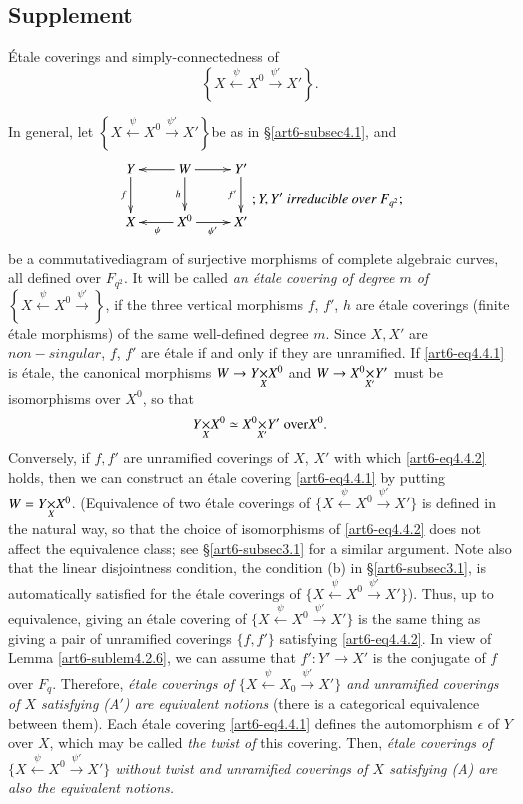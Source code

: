 \subsection{Supplement}\label{sec6-subsec4.4}
\'Etale coverings and simply-connectedness of 
$$
\left\{X \xleftarrow{\psi} X^0 \xrightarrow{\psi'} X' \right\}.
$$

In general, let $\left\{X \xleftarrow{\psi} X^0 \xrightarrow{\psi'} X' \right\}$be as in \S \ref{art6-subsec4.1}, and
\setcounter{equation}{0}
\begin{equation}
\vcenter{
\xymatrix{
Y \ar[d]_-f & W\ar[d]_-h\ar[r]\ar[l] & Y'\ar[d]_-{f'}\\
X & X^0 \ar[r]_{\psi'} \ar[l]^{\psi} & X'
} }
; Y, Y' \textit{ irreducible over } F_{q^2};
\label{art6-eq4.4.1}
\end{equation}
be a commutative\pageoriginale diagram of surjective morphisms of complete algebraic curves, all defined over $F_{q^2}$. It will be called \textit{an \'etale covering of degree $m$ of}  $\left\{X \xleftarrow{\psi} X^0 \xrightarrow{\psi'} \right\}$, if the three vertical morphisms $f$, $f'$, $h$ are \'etale coverings (finite \'etale morphisms) of the same well-defined degree $m$. Since $X, X'$ are $non-singular$, $f$, $f'$ are \'etale if and only if they are unramified. If \eqref{art6-eq4.4.1} is \'etale, the canonical morphisms $W \to \fprod{Y}{X^0}{X}$ and $W \to \fprod{X^0}{Y'}{X'}$ must be isomorphisms over $X^0$, so that 
\begin{equation}
\fprod{Y}{X^0}{X} \simeq \fprod{X^0}{Y'}{X'} \text{ over} X^0. 
\label{art6-eq4.4.2}
\end{equation}
Conversely, if $f, f'$ are unramified coverings of $X$, $X'$ with which \eqref{art6-eq4.4.2} holds, then we can construct an \'etale covering \eqref{art6-eq4.4.1} by putting $W = \fprod{Y}{X^0}{X}$. (Equivalence of two \'etale coverings of $\{ X \xleftarrow{\psi} X^0 \xrightarrow{\psi'} X'\}$ is defined in the natural way, so that the choice of isomorphisms of \eqref{art6-eq4.4.2} does not affect the equivalence class; see \S \ref{art6-subsec3.1} for a similar argument. Note also that the linear disjointness condition, the condition (b) in \S \ref{art6-subsec3.1}, is automatically satisfied for the \'etale coverings of $\{X \xleftarrow{\psi} X^0 \xrightarrow{\psi'} X'\}$). Thus, up to equivalence, giving an \'etale covering of $\{X \xleftarrow{\psi} X^0 \xrightarrow{\psi'} X'\}$ is the same thing as giving a pair of unramified coverings $\{f, f'\}$ satisfying \eqref{art6-eq4.4.2}. In view of Lemma \ref{art6-sublem4.2.6}, we can assume that $f': Y' \to X'$ is the conjugate of $f$ over $F_q$. Therefore, \textit{\'etale coverings of $\{X \xleftarrow{\psi} X_0 \xrightarrow{\psi'}X'\}$ and unramified coverings of $X$ satisfying (A$'$) are equivalent notions} (there is a categorical equivalence between them). Each \'etale covering \eqref{art6-eq4.4.1} defines the automorphism $\epsilon$ of $Y$ over $X$, which may be called \textit{the twist of}  this covering. Then, \textit{\'etale coverings of $\{X \xleftarrow{\psi} X^0\xrightarrow{\psi'} X'\}$ without twist and unramified coverings of $X$ satisfying (A) are also the equivalent notions.} 

